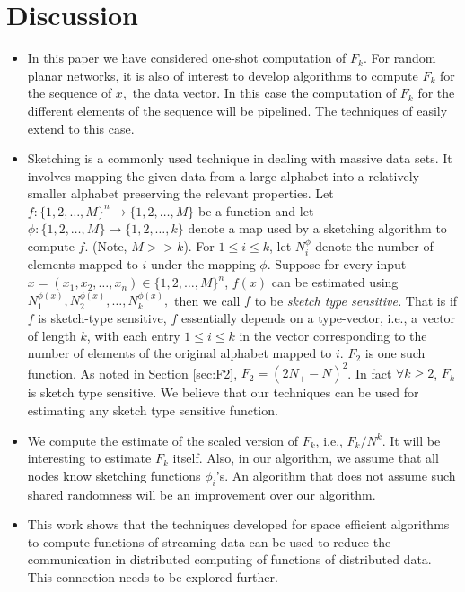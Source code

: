 \documentclass[10pt,twosided,a4paper,draft,onecolumn]{article}
\begin{document}
\section{Discussion}
\label{sec:dis}
\begin{itemize}

\item In this paper we have considered one-shot computation of $F_k.$
  For random planar networks, it is also of interest to develop
  algorithms to compute $F_k$ for the sequence of $x,$ the data
  vector. In this case the computation of $F_k$ for the different
  elements of the sequence will be pipelined. The techniques of
  \cite{Kamath08,Iyer11} easily extend to this case.

\item Sketching is a commonly used technique in dealing with massive
  data sets.  It involves mapping the given data from a large alphabet
  into a relatively smaller alphabet preserving the relevant
  properties. Let $f: \{1,2,\ldots, M\}^n \rightarrow
  \{1,2,\ldots,M\}$ be a function and let $\phi: \{1,2,\ldots, M\}
  \rightarrow \{1,2,\ldots,k\}$ denote a map used by a sketching
  algorithm to compute $f$. (Note, $M>>k$).  For $1 \leq i \leq k$,
  let $N^{\phi}_i$ denote the number of elements mapped to $i$ under
  the mapping $\phi$.  Suppose for every input $x = (x_1,
  x_2,\ldots,x_n) \in \{1,2,\ldots,M\}^n$, $f(x)$ can be estimated
  using $N^{\phi(x)}_1, N^{\phi(x)}_2, \ldots, N^{\phi(x)}_k,$ then we
  call $f$ to be \emph{sketch type sensitive.}  That is if $f$ is
  sketch-type sensitive, $f$ essentially depends on a type-vector,
  i.e., a vector of length $k$, with each entry $1\leq i \leq k$ in
  the vector corresponding to the number of elements of the original
  alphabet mapped to $i$.  $F_2$ is one such function. As noted in
  Section \ref{sec:F2}, $F_2= (2N_+-N)^2$.  In fact $\forall k \geq
  2$, $F_k$ is sketch type sensitive. We believe that our techniques
  can be used for estimating any sketch type sensitive function.

\item We compute the estimate of the scaled version of $F_k$, i.e.,
  $F_k/N^k$. It will be interesting to estimate $F_k$ itself. Also, in
  our algorithm, we assume that all nodes know sketching functions
  $\phi_i$'s.  An algorithm that does not assume such shared
  randomness will be an improvement over our algorithm.

\item This work shows that the techniques developed for space
  efficient algorithms to compute functions of streaming data can be
  used to reduce the communication in distributed computing of
  functions of distributed data. This connection needs to be explored
  further.
\end{itemize}



\end{document}
